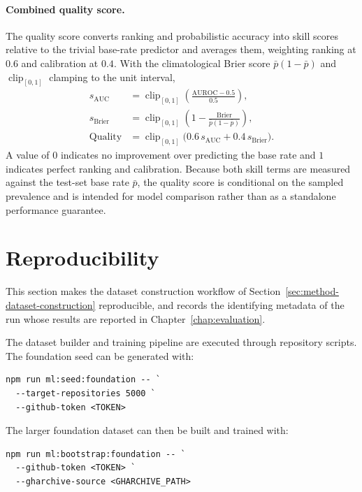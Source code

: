 \paragraph{Combined quality score.} The quality score converts ranking and
probabilistic accuracy into skill scores relative to the trivial base-rate
predictor and averages them, weighting ranking at \(0.6\) and calibration at
\(0.4\). With the climatological Brier score \(\bar{p}(1-\bar{p})\) and
\(\operatorname{clip}_{[0,1]}\) clamping to the unit interval,
\begin{align}
  s_{\mathrm{AUC}}   &= \operatorname{clip}_{[0,1]}\!\left(\frac{\mathrm{AUROC} - 0.5}{0.5}\right), \\
  s_{\mathrm{Brier}} &= \operatorname{clip}_{[0,1]}\!\left(1 - \frac{\mathrm{Brier}}{\bar{p}(1-\bar{p})}\right), \\
  \mathrm{Quality}   &= \operatorname{clip}_{[0,1]}\!\big(0.6\,s_{\mathrm{AUC}} + 0.4\,s_{\mathrm{Brier}}\big).
\end{align}
A value of \(0\) indicates no improvement over predicting the base rate and \(1\)
indicates perfect ranking and calibration. Because both skill terms are measured
against the test-set base rate \(\bar{p}\), the quality score is conditional on the
sampled prevalence and is intended for model comparison rather than as a
standalone performance guarantee.

\section{Reproducibility}
\label{sec:method-reproducibility}

This section makes the dataset construction workflow of Section~\ref{sec:method-dataset-construction} reproducible, and records the identifying metadata of the run whose results are reported in Chapter~\ref{chap:evaluation}.

The dataset builder and training pipeline are executed through repository scripts. The foundation seed can be generated with:

\begin{verbatim}
npm run ml:seed:foundation -- `
  --target-repositories 5000 `
  --github-token <TOKEN>
\end{verbatim}

The larger foundation dataset can then be built and trained with:

\begin{verbatim}
npm run ml:bootstrap:foundation -- `
  --github-token <TOKEN> `
  --gharchive-source <GHARCHIVE_PATH>
\end{verbatim}

